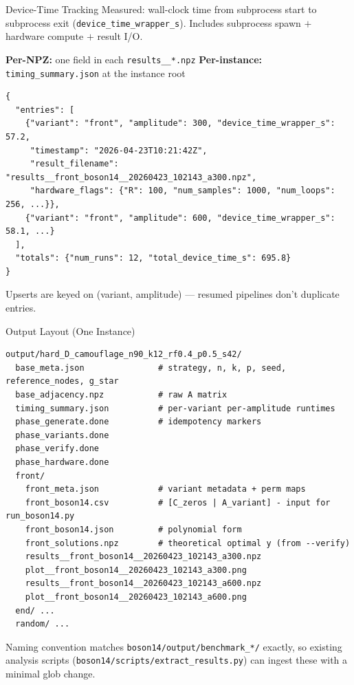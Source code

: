 \documentclass[aspectratio=169]{beamer}
\begin{document}
\begin{frame}[fragile]{Device-Time Tracking}
    Measured: wall-clock time from subprocess start to subprocess exit (\texttt{device\_time\_wrapper\_s}). Includes subprocess spawn $+$ hardware compute $+$ result I/O.

    \vspace{0.5em}
    \textbf{Per-NPZ:} one field in each \texttt{results\_\_*.npz}
    \textbf{Per-instance:} \texttt{timing\_summary.json} at the instance root

\begin{lstlisting}[style=json,numbers=none]
{
  "entries": [
    {"variant": "front", "amplitude": 300, "device_time_wrapper_s": 57.2,
     "timestamp": "2026-04-23T10:21:42Z",
     "result_filename": "results__front_boson14__20260423_102143_a300.npz",
     "hardware_flags": {"R": 100, "num_samples": 1000, "num_loops": 256, ...}},
    {"variant": "front", "amplitude": 600, "device_time_wrapper_s": 58.1, ...}
  ],
  "totals": {"num_runs": 12, "total_device_time_s": 695.8}
}
\end{lstlisting}

    \vspace{0.5em}
    Upserts are keyed on (variant, amplitude) --- resumed pipelines don't duplicate entries.
\end{frame}


\begin{frame}[fragile]{Output Layout (One Instance)}
\begin{lstlisting}[style=shell,numbers=none]
output/hard_D_camouflage_n90_k12_rf0.4_p0.5_s42/
  base_meta.json               # strategy, n, k, p, seed, reference_nodes, g_star
  base_adjacency.npz           # raw A matrix
  timing_summary.json          # per-variant per-amplitude runtimes
  phase_generate.done          # idempotency markers
  phase_variants.done
  phase_verify.done
  phase_hardware.done
  front/
    front_meta.json            # variant metadata + perm maps
    front_boson14.csv          # [C_zeros | A_variant] - input for run_boson14.py
    front_boson14.json         # polynomial form
    front_solutions.npz        # theoretical optimal y (from --verify)
    results__front_boson14__20260423_102143_a300.npz
    plot__front_boson14__20260423_102143_a300.png
    results__front_boson14__20260423_102143_a600.npz
    plot__front_boson14__20260423_102143_a600.png
  end/ ...
  random/ ...
\end{lstlisting}

    Naming convention matches \texttt{boson14/output/benchmark\_*/} exactly, so existing analysis scripts (\texttt{boson14/scripts/extract\_results.py}) can ingest these with a minimal glob change.
\end{frame}
\end{document}
